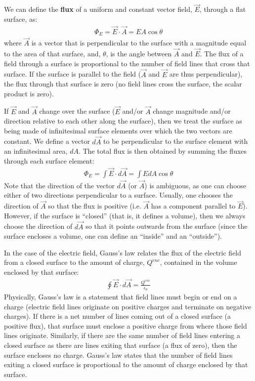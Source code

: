 \begin{chapterSummary}
We can define the \textbf{flux} of a uniform and constant vector field, $\vec E$, through a flat surface, as:
\begin{align*}
\Phi_E = \vec E \cdot \vec A = EA\cos\theta
\end{align*}
where $\vec A$ is a vector that is perpendicular to the surface with a magnitude equal to the area of that surface, and, $\theta$, is the angle between $\vec A$ and $\vec E$. The flux of a field through a surface is proportional to the number of field lines that cross that surface. If the surface is parallel to the field ($\vec A$ and $\vec E$ are thus perpendicular), the flux through that surface is zero (no field lines cross the surface, the scalar product is zero).

If $\vec E$ and $\vec A$ change over the surface ($\vec E$ and/or $\vec A$ change magnitude and/or direction relative to each other along the surface), then we treat the surface as being made of infinitesimal surface elements over which the two vectors are constant. We define a vector $d\vec A$ to be perpendicular to the surface element with an infinitesimal area, $dA$. The total flux is then obtained by summing the fluxes through each surface element:
\begin{align*}
\Phi_E=\int \vec E \cdot d\vec A=\int EdA\cos\theta
\end{align*}
Note that the direction of the vector $d\vec A$ (or $\vec A$) is ambiguous, as one can choose either of two directions perpendicular to a surface. Usually, one chooses the direction of $\vec A$ so that the flux is positive (i.e. $\vec A$ has a component parallel to $\vec E$). However, if the surface is ``closed'' (that is, it defines a volume), then we always choose the direction of $d\vec A$ so that it points outwards from the surface (since the surface encloses a volume, one can define an ``inside'' and an ``outside''). 

In the case of the electric field, Gauss's law relates the flux of the electric field from a closed surface to the amount of charge, $Q^{enc}$, contained in the volume enclosed by that surface:
\begin{align*}
\oint \vec E \cdot d\vec A = \frac{Q^{enc}}{\epsilon_0}
\end{align*}
Physically, Gauss's law is a statement that field lines must begin or end on a charge (electric field lines originate on positive charges and terminate on negative charges). If there is a net number of lines coming out of a closed surface (a positive flux), that surface must enclose a positive charge from where those field lines originate. Similarly, if there are the same number of field lines entering a closed surface as there are lines exiting that surface (a flux of zero), then the surface encloses no charge. Gauss's law states that the number of field lines exiting a closed surface is proportional to the amount of charge enclosed by that surface.


\end{chapterSummary}
